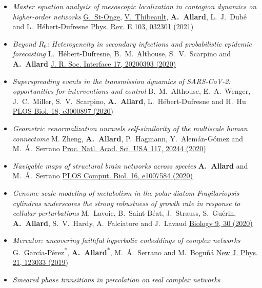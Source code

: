 \documentclass[11pt]{article}
\begin{document}
\begin{itemize}[itemsep=0.5em]
%
  \item \textit{Master equation analysis of mesoscopic localization in contagion dynamics on higher-order networks}\split
  \uline{G.~St-Onge}, \uline{V.~Thibeault}, \textbf{A.~Allard}, L.~J.~Dub\'e and L.~H\'ebert-Dufresne\split
  \href{http://doi.org/10.1103/PhysRevE.103.032301}{Phys. Rev. E 103, 032301 (2021)}
  \item \textit{Beyond $R_0$: Heterogeneity in secondary infections and probabilistic epidemic forecasting}\split
  L.~H\'ebert-Dufresne, B.~M.~Althouse, S.~V.~Scarpino and \textbf{A.~Allard}\split
  \href{https://doi.org/10.1098/rsif.2020.0393}{J. R. Soc. Interface 17, 20200393 (2020)}
%
  \item \textit{Superspreading events in the transmission dynamics of SARS-CoV-2: opportunities for interventions and control}\split
  B.~M.~Althouse, E.~A.~Wenger, J.~C.~Miller, S.~V.~Scarpino, \textbf{A.~Allard}, L.~H\'ebert-Dufresne and H.~Hu\split
  \href{https://doi.org/10.1371/journal.pbio.3000897}{PLOS Biol. 18, e3000897 (2020)}
%
  \item \textit{Geometric renormalization unravels self-similarity of the multiscale human connectome}\split
  M. Zheng, \textbf{A.~Allard}, P.~Hagmann, Y.~Alem\'an-G\'omez and M.~\'A.~Serrano\split
  \href{http://doi.org/10.1073/pnas.1922248117}{Proc. Natl. Acad. Sci. USA 117, 20244 (2020)}
%
  \item \textit{Navigable maps of structural brain networks across species}\split
  \textbf{A.~Allard} and M.~\'A.~Serrano\split
  \href{https://doi.org/10.1371/journal.pcbi.1007584}{PLOS Comput. Biol. 16, e1007584 (2020)}
  \item \textit{Genome-scale modeling of metabolism in the polar diatom Fragilariopsis cylindrus underscores the strong robustness of growth rate in response to cellular perturbations}\split
  M.~Lavoie, B.~Saint-Béat, J.~Strauss, S.~Guérin, \textbf{A.~Allard}, S.~V.~Hardy, A.~Falciatore and J.~Lavaud\split
  \href{https://doi.org/10.3390/biology9020030}{Biology 9, 30 (2020)}
%
  \item \textit{Mercator: uncovering faithful hyperbolic embeddings of complex networks}\split
  G.~Garc\'ia-P\'erez\textsuperscript{*}, \textbf{A.~Allard}\textsuperscript{*}, M.~\'A.~Serrano and M.~Bogu\~n\'a\split
  \href{https://doi.org/10.1088/1367-2630/ab57d2}{New J. Phys. 21, 123033 (2019)}
%
  \item \textit{Smeared phase transitions in percolation on real complex networks}\split

\end{itemize}
\end{document}

